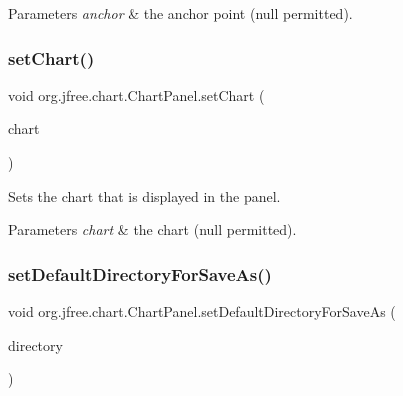 \begin{DoxyParams}{Parameters}
{\em anchor} & the anchor point ({\ttfamily null} permitted). \\
\hline
\end{DoxyParams}
\mbox{\label{classorg_1_1jfree_1_1chart_1_1_chart_panel_a56e3f287b3d61074287004c832216f76}} 
\subsubsection{\texorpdfstring{set\+Chart()}{setChart()}}
{\footnotesize\ttfamily void org.\+jfree.\+chart.\+Chart\+Panel.\+set\+Chart (\begin{DoxyParamCaption}\item[{\mbox{\hyperlink{classorg_1_1jfree_1_1chart_1_1_j_free_chart}{J\+Free\+Chart}}}]{chart }\end{DoxyParamCaption})}

Sets the chart that is displayed in the panel.


\begin{DoxyParams}{Parameters}
{\em chart} & the chart ({\ttfamily null} permitted). \\
\hline
\end{DoxyParams}
\mbox{\label{classorg_1_1jfree_1_1chart_1_1_chart_panel_ac522702a7beadb12aaa4b53ec348df0c}} 
\subsubsection{\texorpdfstring{set\+Default\+Directory\+For\+Save\+As()}{setDefaultDirectoryForSaveAs()}}
{\footnotesize\ttfamily void org.\+jfree.\+chart.\+Chart\+Panel.\+set\+Default\+Directory\+For\+Save\+As (\begin{DoxyParamCaption}\item[{File}]{directory }\end{DoxyParamCaption})}

